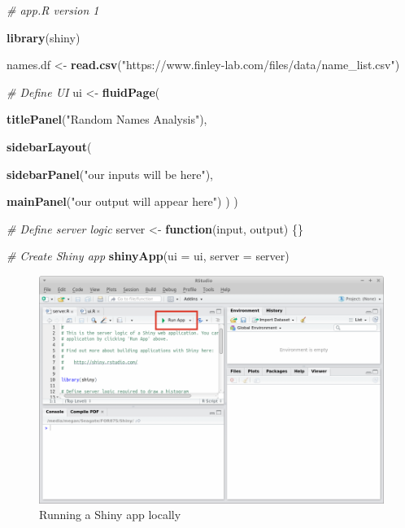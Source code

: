 \documentclass[
]{krantz}
\makeatletter
\newenvironment{Shaded}{\begin{snugshade}}{\end{snugshade}}
\newcommand{\CommentTok}[1]{\textcolor[rgb]{0.37,0.37,0.37}{\textit{#1}}}
\newcommand{\ControlFlowTok}[1]{\textcolor[rgb]{0.27,0.27,0.27}{\textbf{#1}}}
\newcommand{\DataTypeTok}[1]{\textcolor[rgb]{0.27,0.27,0.27}{#1}}
\newcommand{\KeywordTok}[1]{\textcolor[rgb]{0.27,0.27,0.27}{\textbf{#1}}}
\newcommand{\NormalTok}[1]{#1}
\newcommand{\StringTok}[1]{\textcolor[rgb]{0.5,0.5,0.5}{#1}}
\newenvironment{kframe}{%
\medskip{}
\setlength{\fboxsep}{.8em}
 \def\at@end@of@kframe{}%
 \ifinner\ifhmode%
  \def\at@end@of@kframe{\end{minipage}}%
  \begin{minipage}{\columnwidth}%
 \fi\fi%
 \def\FrameCommand##1{\hskip\@totalleftmargin \hskip-\fboxsep
 \colorbox{shadecolor}{##1}\hskip-\fboxsep
     \hskip-\linewidth \hskip-\@totalleftmargin \hskip\columnwidth}%
 \MakeFramed {\advance\hsize-\width
   \@totalleftmargin\z@ \linewidth\hsize
   \@setminipage}}%
 {\par\unskip\endMakeFramed%
 \at@end@of@kframe}
\renewenvironment{Shaded}{\begin{kframe}}{\end{kframe}}
\makeatother
\begin{document}
\begin{Shaded}
\begin{Highlighting}[]
\CommentTok{\# app.R version 1}

\KeywordTok{library}\NormalTok{(shiny)}

\NormalTok{names.df \textless{}{-}}\StringTok{ }\KeywordTok{read.csv}\NormalTok{(}\StringTok{"https://www.finley{-}lab.com/files/data/name\_list.csv"}\NormalTok{)}

\CommentTok{\# Define UI}
\NormalTok{ui \textless{}{-}}\StringTok{ }\KeywordTok{fluidPage}\NormalTok{(}
  
  \KeywordTok{titlePanel}\NormalTok{(}\StringTok{"Random Names Analysis"}\NormalTok{),}
  
  \KeywordTok{sidebarLayout}\NormalTok{(}
    
    \KeywordTok{sidebarPanel}\NormalTok{(}\StringTok{"our inputs will be here"}\NormalTok{),}
    
    \KeywordTok{mainPanel}\NormalTok{(}\StringTok{"our output will appear here"}\NormalTok{)}
\NormalTok{  )}
\NormalTok{)}

\CommentTok{\# Define server logic}
\NormalTok{server \textless{}{-}}\StringTok{ }\ControlFlowTok{function}\NormalTok{(input, output) \{\}}

\CommentTok{\# Create Shiny app}
\KeywordTok{shinyApp}\NormalTok{(}\DataTypeTok{ui =}\NormalTok{ ui, }\DataTypeTok{server =}\NormalTok{ server)}
\end{Highlighting}
\end{Shaded}

\begin{figure}
\includegraphics[width=1\linewidth]{../figures/RStudio_runApp} \caption{Running a Shiny app locally}\label{fig:fig1}
\end{figure}
\end{document}
